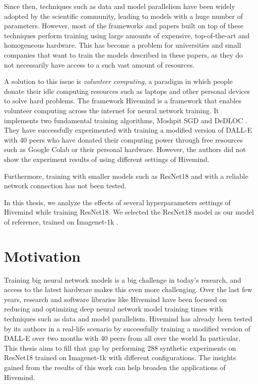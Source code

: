 Since then, techniques such as data and model parallelism have been widely adopted by the scientific community, leading to models with a huge number of parameters.
However, most of the frameworks and papers built on top of these techniques perform training using large amounts of expensive, top-of-the-art and homogeneous hardware.
This has become a problem for universities and small companies that want to train the models described in these papers, as they do not necessarily have access to a such vast amount of resources.

A solution to this issue is \textit{volunteer computing}, a paradigm in which people donate their idle computing resources such as laptops and other personal devices to solve hard problems.
The framework Hivemind \cite{riabinin2020hivemind} is a framework that enables volunteer computing across the internet for neural network training.
It implements two fundamental training algorithms, Moshpit SGD \cite{DBLP:journals/corr/abs-2103-03239} and DeDLOC \cite{DBLP:journals/corr/abs-2106-10207}.
They have successfully experimented with training a modified version of DALL-E with 40 peers \cite{learning30:online} who have donated their computing power through free resources such as Google Colab or their personal hardware.
However, the authors did not show the experiment results of using different settings of Hivemind.


Furthermore, training with smaller models such as ResNet18 \cite{he2015deep} and with a reliable network connection has not been tested.

In this thesis, we analyze the effects of several hyperparameters settings of Hivemind while training ResNet18.
We selected the ResNet18 \cite{he2015deep} model as our model of reference, trained on Imagenet-1k \cite{deng2009imagenet}.

\section{Motivation}

Training big neural network models is a big challenge in today's research, and access to the latest hardware makes this even more challenging.
Over the last few years, research and software libraries like Hivemind have been focused on reducing and optimizing deep neural network model training times with techniques such as data and model parallelism.
Hivemind has already been tested by its authors in a real-life scenario by successfully training a modified version of DALL-E over two months with 40 peers from all over the world \cite{DBLP:journals/corr/abs-2106-10207}
In particular, 
This thesis aims to fill that gap by performing 288 synthetic experiments on ResNet18 trained on Imagenet-1k with different configurations.
The insights gained from the results of this work can help broaden the applications of Hivemind.


